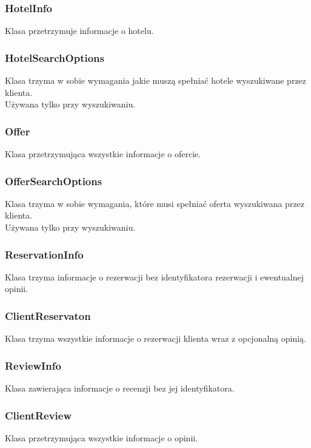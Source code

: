 \documentclass{article}
\begin{document}
\subsubsection{HotelInfo}
Klasa przetrzymuje informacje o hotelu.

\subsubsection{HotelSearchOptions}
Klasa trzyma w sobie wymagania jakie muszą spełniać hotele wyszukiwane przez klienta.\\
Używana tylko przy wyszukiwaniu.

\subsubsection{Offer}
Klasa przetrzymująca wszystkie informacje o ofercie.

\subsubsection{OfferSearchOptions}
Klasa trzyma w sobie wymagania, które musi spełniać oferta wyszukiwana przez klienta.\\
Używana tylko przy wyszukiwaniu.

\subsubsection{ReservationInfo}
Klasa trzyma informacje o rezerwacji bez identyfikatora rezerwacji i ewentualnej opinii.

\subsubsection{ClientReservaton}
Klasa trzyma wszystkie informacje o rezerwacji klienta wraz z opcjonalną opinią.

\subsubsection{ReviewInfo}
Klasa zawierająca informacje o recenzji bez jej identyfikatora.

\subsubsection{ClientReview}
Klasa przetrzymująca wszystkie informacje o opinii.
\end{document}
